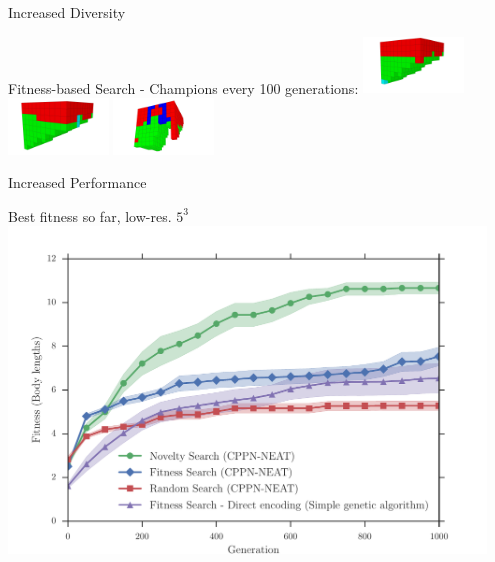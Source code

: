 \documentclass[6pt]{beamer}
\begin{document}
{\begin{frame}{Increased Diversity}
\begin{block}{Fitness-based Search - Champions every 100 generations:}
\includegraphics[width=0.2\textwidth]{../Figures/Robots/f_4_g_800.jpg}
\includegraphics[width=0.2\textwidth]{../Figures/Robots/f_4_g_900.jpg}
\includegraphics[width=0.2\textwidth]{../Figures/Robots/f_4_g_1000.jpg}
\end{block}
\end{frame}

\begin{frame}{Increased Performance}
\begin{block}{Best fitness so far, low-res. $5^3$}
\centering
\includegraphics[width=0.95\textwidth]{../Figures/Results/FitNovRandomDirectSize5.pdf}
\end{block}
\end{frame}

}
\end{document}
